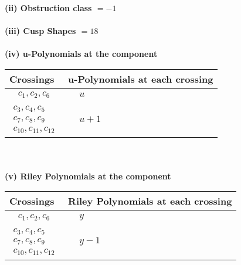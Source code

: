 \documentclass[1p]{elsarticle_modified}
\theoremstyle{definition}
\begin{document}
\flushleft \textbf{(ii) Obstruction class $= -1$}\\~\\
\flushleft \textbf{(iii) Cusp Shapes $= 18$}\\~\\
\newpage\renewcommand{\arraystretch}{1}
\flushleft \textbf{(iv) u-Polynomials at the component}\newline \\
\begin{tabular}{m{50pt}|m{274pt}}
Crossings & \hspace{64pt}u-Polynomials at each crossing \\
\hline $$\begin{aligned}c_{1},c_{2},c_{6}\end{aligned}$$&$\begin{aligned}
&u
\end{aligned}$\\
\hline $$\begin{aligned}c_{3},c_{4},c_{5}\\c_{7},c_{8},c_{9}\\c_{10},c_{11},c_{12}\end{aligned}$$&$\begin{aligned}
&u+1
\end{aligned}$\\
\hline
\end{tabular}\\~\\
\newpage\renewcommand{\arraystretch}{1}
\flushleft \textbf{(v) Riley Polynomials at the component}\newline \\
\begin{tabular}{m{50pt}|m{274pt}}
Crossings & \hspace{64pt}Riley Polynomials at each crossing \\
\hline $$\begin{aligned}c_{1},c_{2},c_{6}\end{aligned}$$&$\begin{aligned}
&y
\end{aligned}$\\
\hline $$\begin{aligned}c_{3},c_{4},c_{5}\\c_{7},c_{8},c_{9}\\c_{10},c_{11},c_{12}\end{aligned}$$&$\begin{aligned}
&y-1
\end{aligned}$\\
\hline
\end{tabular}\\~\\
\end{document}
